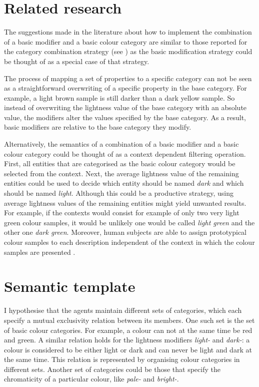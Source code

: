\section{Related research}

The suggestions made in the literature about how to implement the
combination of a basic modifier and a basic colour category are
similar to those reported for the category combination strategy
(see ) as the basic
  modification strategy could be thought of as a special case of that
strategy.

The process of mapping a set of properties to a specific category can
not be seen as a straightforward overwriting of a specific property
in the base category. For example, a light brown sample is still
darker than a dark yellow sample. So instead of overwriting the
lightness value of the base category with an absolute value, the
modifiers alter the values specified by the base category. As a
result, basic modifiers are relative to the base category they
modify.

Alternatively, the semantics of a combination of a basic
modifier and a basic colour category could be thought of as a context
dependent filtering operation. First, all entities that are categorised
as the basic colour category would be selected from the context. Next,
the average lightness value of the remaining entities could be used to
decide which entity should be named \textit{dark} and which should be named
\textit{light}. Although this could be a productive strategy, using  average lightness
values of the remaining entities might yield unwanted results. For example, 
if the contexts would consist for example of
only two very light green colour samples, it would be unlikely one would
be called \textit{light green} and the other one \textit{dark green}. Moreover,
human subjects are able to assign prototypical colour samples to each
description independent of the context in which the colour samples are
presented \citep{safuanova07russian}.

\section{Semantic template}

I hypothesise that the agents maintain different sets of categories,
which each specify a mutual exclusivity relation between its
members. One such set is the set of basic colour categories. For
example, a colour can not at the same time be red and green. A similar
relation holds for the lightness modifiers \textit{light-} and \textit{dark-}:
a colour is considered to be either light or dark and can never be
light and dark at the same time. This relation is represented by
organising colour categories in different sets. Another set of
categories could be those that specify the chromaticity of a
particular colour, like \textit{pale-} and \textit{bright-}.

